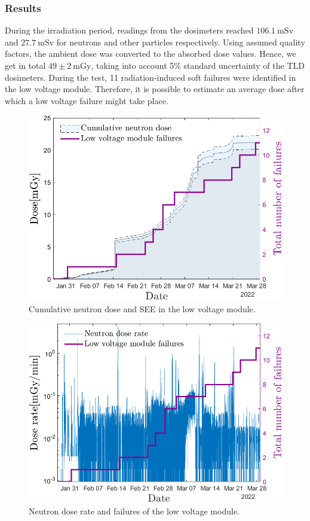 \subsubsection{Results}
During the irradiation period, readings from the dosimeters reached $106.1\mathrm{\ mSv}$ and $27.7\mathrm{\ mSv}$ for neutrons and other particles respectively.
Using assumed quality factors, the ambient dose was converted to the absorbed dose values. Hence, we get in total $49\pm{2}\mathrm{\ mGy}$, taking into account 5\% standard uncertainty of the TLD dosimeters. During the test, 11 radiation-induced soft failures were identified in the low voltage module. Therefore, it is possible to estimate an average dose after which a low voltage failure might take place.
\begin{figure}[!h]
    \centering
    \includegraphics[width=0.6\columnwidth]{Chapter4/images/LV_failure_and_neutronsrate.png}
    \caption{Cumulative neutron dose and \gls{SEE} in the low voltage module.}
    \label{fig:lv_neutrons}
\end{figure}
\begin{figure}[!h]
    \centering
    \includegraphics[width=0.6\columnwidth]{Chapter4/images/neutrons_dose_rate.png}
    \caption{Neutron dose rate and failures of the low voltage module.}
    \label{fig:lv_neutrons_rate}
\end{figure}
